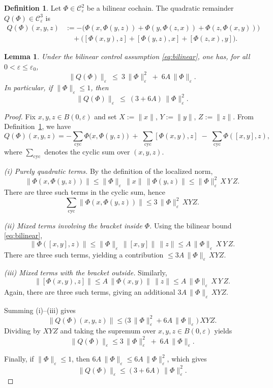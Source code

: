 \documentclass[10pt]{amsart}
\numberwithin{equation}{section}
\newtheorem{lem}[theorem]{Lemma}
\theoremstyle{remark}
\theoremstyle{definition}
\newtheorem{dfn}[theorem]{Definition}
\begin{document}
\begin{dfn}\label{def:Q}
Let $\Phi \in \mathcal C_\varepsilon^2$ be a bilinear cochain. The quadratic remainder $Q(\Phi)\in \mathcal C_\varepsilon^3$ is
\[
\begin{aligned}
Q(\Phi)(x,y,z)
&:=
-\bigl(\Phi(x,\Phi(y,z))+\Phi(y,\Phi(z,x))+\Phi(z,\Phi(x,y))\bigr)\\
&\quad
+\bigl([\Phi(x,y),z]+[\Phi(y,z),x]+[\Phi(z,x),y]\bigr).
\end{aligned}
\]
\end{dfn}

\begin{lem}\label{lem:QPhi_small}
Under the bilinear control assumption \eqref{eq:bilinear}, one has, for all $0<\varepsilon\le\varepsilon_0$,
\[
\|Q(\Phi)\|_\varepsilon \ \le\ 3\,\|\Phi\|_\varepsilon^2 \;+\; 6A\,\|\Phi\|_\varepsilon.
\]
In particular, if $\|\Phi\|_\varepsilon \le 1$, then
\[
\|Q(\Phi)\|_\varepsilon \ \le\ (3+6A)\,\|\Phi\|_\varepsilon^2.
\]
\end{lem}

\begin{proof}
Fix $x,y,z\in B(0,\varepsilon)$ and set $X:=\|x\|$, $Y:=\|y\|$, $Z:=\|z\|$.
From Definition~\ref{def:Q}, we have
\[
Q(\Phi)(x,y,z)
=
-\sum_{\mathrm{cyc}}\Phi\bigl(x,\Phi(y,z)\bigr)
\;+\;\sum_{\mathrm{cyc}}[\Phi(x,y),z]
\;-\;\sum_{\mathrm{cyc}}\Phi([x,y],z),
\]
where $\sum_{\mathrm{cyc}}$ denotes the cyclic sum over $(x,y,z)$.

\smallskip\noindent
\emph{(i) Purely quadratic terms.}
By the definition of the localized norm,
\[
\|\Phi(x,\Phi(y,z))\|
\le
\|\Phi\|_\varepsilon\,\|x\|\,\|\Phi(y,z)\|
\le
\|\Phi\|_\varepsilon^2\,X\,Y\,Z.
\]
There are three such terms in the cyclic sum, hence
\[
\sum_{\mathrm{cyc}}\|\Phi(x,\Phi(y,z))\|
\le 3\,\|\Phi\|_\varepsilon^2\,XYZ.
\]

\smallskip\noindent
\emph{(ii) Mixed terms involving the bracket inside $\Phi$.}
Using the bilinear bound \eqref{eq:bilinear},
\[
\|\Phi([x,y],z)\|
\le
\|\Phi\|_\varepsilon\,\|[x,y]\|\,\|z\|
\le
A\,\|\Phi\|_\varepsilon\,X\,Y\,Z.
\]
There are three such terms, yielding a contribution $\le 3A\,\|\Phi\|_\varepsilon\,XYZ$.

\smallskip\noindent
\emph{(iii) Mixed terms with the bracket outside.}
Similarly,
\[
\|[\Phi(x,y),z]\|
\le
A\,\|\Phi(x,y)\|\,\|z\|
\le
A\,\|\Phi\|_\varepsilon\,X\,Y\,Z.
\]
Again, there are three such terms, giving an additional $3A\,\|\Phi\|_\varepsilon\,XYZ$.

\smallskip
Summing (i)--(iii) gives
\[
\|Q(\Phi)(x,y,z)\|
\le
\bigl(3\,\|\Phi\|_\varepsilon^2 + 6A\,\|\Phi\|_\varepsilon\bigr)\,XYZ.
\]
Dividing by $XYZ$ and taking the supremum over $x,y,z\in B(0,\varepsilon)$ yields
\[
\|Q(\Phi)\|_\varepsilon
\le
3\,\|\Phi\|_\varepsilon^2 \;+\; 6A\,\|\Phi\|_\varepsilon.
\]

\smallskip
Finally, if $\|\Phi\|_\varepsilon\le 1$, then $6A\,\|\Phi\|_\varepsilon\le 6A\,\|\Phi\|_\varepsilon^2$, which gives
\[
\|Q(\Phi)\|_\varepsilon \le (3+6A)\,\|\Phi\|_\varepsilon^2.
\]
\end{proof}
\end{document}
